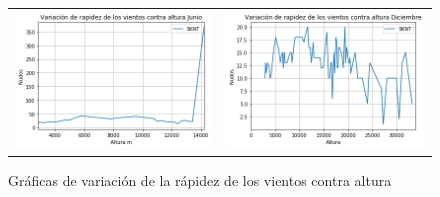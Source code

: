 \documentclass[a4paper]{article}
\begin{document}
\begin{figure}[h]
\begin{tabular}{ll}
\includegraphics[scale=0.5]{grafica7.png}
&
\includegraphics[scale=0.5]{grafica8.png}
\end{tabular}
\caption{Gráficas de variación de la rápidez de los vientos contra altura}

\end{figure}
\end{document}
